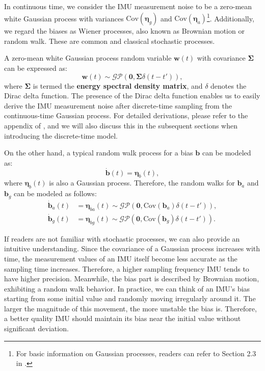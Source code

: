 In continuous time, we consider the IMU measurement noise to be a zero-mean white Gaussian process with variances $\mathrm{Cov}(\boldsymbol{\eta}_g)$ and $\mathrm{Cov}(\boldsymbol{\eta}_a)$\footnote{For basic information on Gaussian processes, readers can refer to Section 2.3 in \cite{Barfoot2016}.}. Additionally, we regard the biases as Wiener processes, also known as Brownian motion or random walk. These are common and classical stochastic processes.

A zero-mean white Gaussian process random variable $\bm{w}(t)$ with covariance $\boldsymbol{\Sigma}$ can be expressed as:
\begin{equation}\label{eq:white-gaussian-process}
	\bm{w}(t) \sim \mathcal{GP}(\bm{0}, \boldsymbol{\Sigma} \delta (t-t')),
\end{equation}
where $\boldsymbol{\Sigma}$ is termed the \textbf{energy spectral density matrix}, and $\delta$ denotes the Dirac delta function. The presence of the Dirac delta function enables us to easily derive the IMU measurement noise after discrete-time sampling from the continuous-time Gaussian process. For detailed derivations, please refer to the appendix of \cite{Crassidis2006}, and we will also discuss this in the subsequent sections when introducing the discrete-time model.

On the other hand, a typical random walk process for a bias $\bm{b}$ can be modeled as:
\begin{equation}\label{eq:random-walk}
	\dot{\bm{b}}(t) = \boldsymbol{\eta}_b (t),
\end{equation}
where $\boldsymbol{\eta}_b (t)$ is also a Gaussian process. Therefore, the random walks for $\bm{b}_a$ and $\bm{b}_g$ can be modeled as follows:
\begin{subequations}\label{eq:bias-random-walk}
	\begin{align}
		\dot{\bm{b}}_a (t) &= \boldsymbol{\eta}_{ba}(t) \sim \mathcal{GP}(\bm{0}, 
		\mathrm{Cov}(\boldsymbol{b}_a) \delta (t-t')), \\
		\dot{\bm{b}}_g (t) &= \boldsymbol{\eta}_{bg}(t) \sim \mathcal{GP}(\bm{0}, 
		\mathrm{Cov}(\boldsymbol{b}_g) \delta (t-t')).
	\end{align}
\end{subequations}

If readers are not familiar with stochastic processes, we can also provide an intuitive understanding. Since the covariance of a Gaussian process increases with time, the measurement values of an IMU itself become less accurate as the sampling time increases. Therefore, a higher sampling frequency IMU tends to have higher precision. Meanwhile, the bias part is described by Brownian motion, exhibiting a random walk behavior. In practice, we can think of an IMU's bias starting from some initial value and randomly moving irregularly around it. The larger the magnitude of this movement, the more unstable the bias is. Therefore, a better quality IMU should maintain its bias near the initial value without significant deviation.

